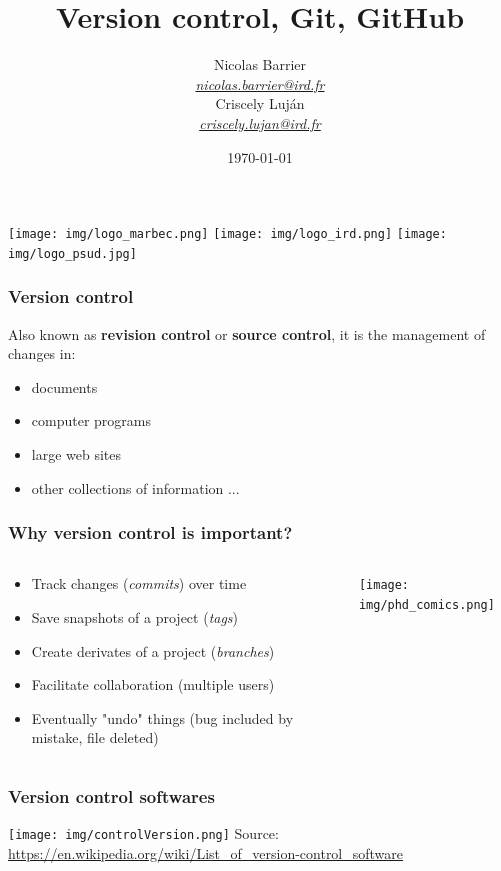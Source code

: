 \documentclass[svgnames]{beamer}
\title[Version control, Git, GitHub]{Version control, Git, GitHub}
\author[Nicolas Barrier \& Criscely Luj\'{a}n]{
Nicolas Barrier\inst{1}\\
\tiny \emph{\href{mailto:nicolas.barrier@ird.fr}{nicolas.barrier@ird.fr}} \\
\normalsize
\vspace{1em} 
Criscely Luj\'{a}n\inst{1,2}\\
\tiny \emph{\href{mailto:criscely.lujan@ird.fr}{criscely.lujan@ird.fr}} \\
\normalsize
}
\institute[shortinst]{\inst{1} IRD, UMR-MARBEC \and \inst{2} Universit\'{e} Paris-Sud}
\date{\today}
\begin{document}
\begin{frame}
    \titlepage 
    \begin{center}
        \texttt{[image: img/logo\_marbec.png]}
        \hspace{2em}
        \texttt{[image: img/logo\_ird.png]}
        \hspace{2em}
        \texttt{[image: img/logo\_psud.jpg]}
    \end{center}
\end{frame}

\begin{frame}
    \frametitle{Version control}

    Also known as \textbf{revision control} or \textbf{source control}, it is the management of changes in: \hfill

    \begin{itemize}
        \item documents
        \item computer programs
        \item large web sites
        \item other collections of information ...
    \end{itemize}
\end{frame}


\begin{frame}
    \frametitle{Why version control is important?}
    \begin{columns}[c]
    		\begin{column}{0.5\linewidth}
			\begin{itemize}
				\item Track changes (\emph{commits}) over time 
				\item Save snapshots of a project (\emph{tags})
				\item Create derivates of a project (\emph{branches})
				\item Facilitate collaboration (multiple users)
				\item Eventually "undo" things (bug included by mistake, file deleted)
			\end{itemize}
    		\end{column}
    		\begin{column}{0.5\linewidth}
        			\texttt{[image: img/phd\_comics.png]}
    		\end{column}
    \end{columns}
\end{frame}


\begin{frame}
\frametitle{Version control softwares}

\begin{center}
\texttt{[image: img/controlVersion.png]}
Source: \url{https://en.wikipedia.org/wiki/List_of_version-control_software}
\end{center}
\end{frame}
\end{document}
